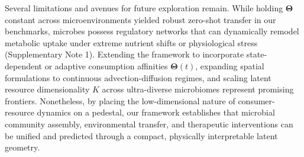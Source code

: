 Several limitations and avenues for future exploration remain. While holding $\mathbf{\Theta}$ constant across microenvironments yielded robust zero-shot transfer in our benchmarks, microbes possess regulatory networks that can dynamically remodel metabolic uptake under extreme nutrient shifts or physiological stress (Supplementary Note 1). Extending the framework to incorporate state-dependent or adaptive consumption affinities $\mathbf{\Theta}(t)$, expanding spatial formulations to continuous advection-diffusion regimes, and scaling latent resource dimensionality $K$ across ultra-diverse microbiomes represent promising frontiers. Nonetheless, by placing the low-dimensional nature of consumer-resource dynamics on a pedestal, our framework establishes that microbial community assembly, environmental transfer, and therapeutic interventions can be unified and predicted through a compact, physically interpretable latent geometry.
